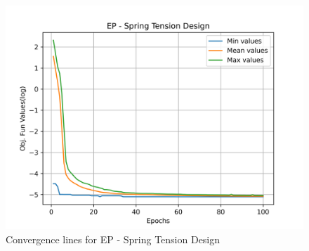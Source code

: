 \begin{figure}[H]
\centering
\caption{Convergence lines for EP - Spring Tension Design}
\label{fig:spring_problem_solve_ep}
\includegraphics[scale=0.5]{images/spring_problem_solve_ep.png}
\end{figure}
        